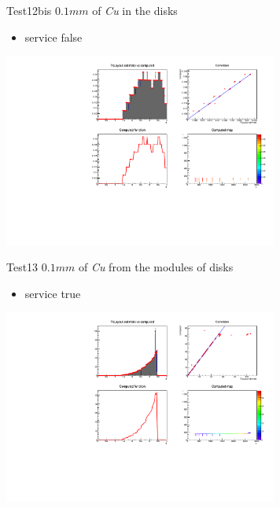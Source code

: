 \documentclass[pdftex, 11pt]{beamer}
\begin{document}
\begin{frame}
  \begin{block}{Test12bis}
    \alert{$0.1 mm$} of \emph{Cu} in the disks
    \begin{itemize}
    \item \alert{service} false
    \end{itemize}
  \end{block}
  \begin{center}
    \includegraphics[width=9cm]{img/test12bis.pdf}
  \end{center}
\end{frame}

\begin{frame}
  \begin{block}{Test13}
    \alert{$0.1 mm$} of \emph{Cu} from the modules of disks
    \begin{itemize}
    \item \alert{service} true
    \end{itemize}
  \end{block}
  \begin{center}
    \includegraphics[width=9cm]{img/test13.pdf}
  \end{center}
\end{frame}

\end{document}

